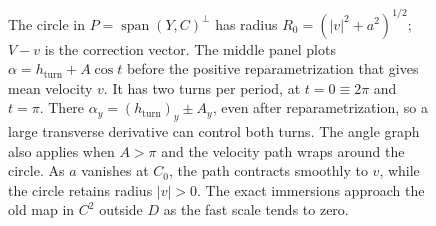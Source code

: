 \begin{figure}[htbp]
{The circle in $P=\operatorname{span}(Y,C)^\perp$ has radius
$R_0=(|v|^2+a^2)^{1/2}$; $V-v$ is the correction vector.
The middle panel plots $\alpha=h_{\mathrm{turn}}+A\cos t$ before the
positive reparametrization that gives mean velocity $v$.
It has two turns per period, at $t=0\equiv2\pi$ and $t=\pi$.
There $\alpha_y=(h_{\mathrm{turn}})_y\pm A_y$, even after
reparametrization, so a large transverse derivative can control both turns.
The angle graph also applies when $A>\pi$ and the velocity path wraps
around the circle.  As $a$ vanishes at $C_0$, the path contracts smoothly
to $v$, while the circle retains radius $|v|>0$.
The exact immersions approach the old map in $C^2$ outside $D$
as the fast scale tends to zero.}
\label{fig:velocity-collar}
\end{figure}
